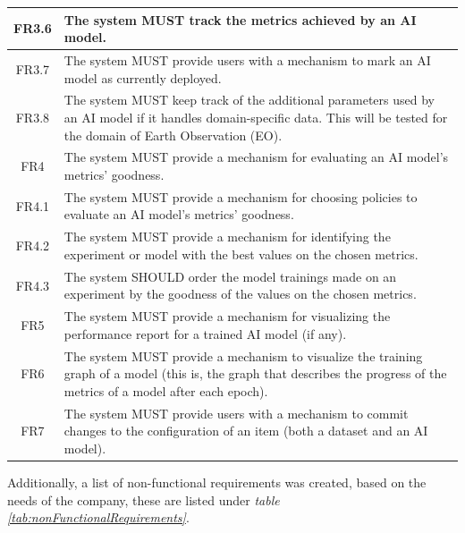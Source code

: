 \begin{table}[H]
\begin{tabular}{ | c | p{12cm} |}
        FR3.6   & The system MUST track the metrics achieved by an AI model. \\ \hline
        FR3.7   & The system MUST provide users with a mechanism to mark an AI model as currently deployed. \\ \hline
        FR3.8   & The system MUST keep track of the additional parameters used by an AI model if it handles domain-specific data. This will be tested for the domain of Earth Observation (EO). \\ \hline
        FR4     & The system MUST provide a mechanism for evaluating an AI model's metrics' goodness.\\ \hline
        FR4.1   & The system MUST provide a mechanism for choosing policies to evaluate an AI model's metrics' goodness.\\ \hline
        FR4.2   & The system MUST provide a mechanism for identifying the experiment or model with the best values on the chosen metrics.\\ \hline
        FR4.3   & The system SHOULD order the model trainings made on an experiment by the goodness of the values on the chosen metrics.\\ \hline
        FR5     & The system MUST provide a mechanism for visualizing the performance report for a trained AI model (if any).\\ \hline
        FR6     & The system MUST provide a mechanism to visualize the training graph of a model (this is, the graph that describes the progress of the metrics of a model after each epoch).\\ \hline
        FR7     & The system MUST provide users with a mechanism to commit changes to the configuration of an item (both a dataset and an AI model). \\ \hline
	\end{tabular}
\end{table}

Additionally, a list of non-functional requirements was created, based on the needs of the company, these are listed under \emph{table \ref{tab:nonFunctionalRequirements}}.

